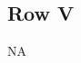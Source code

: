 \documentclass[9pt]{article}
\numberwithin{equation}{section}
\begin{document}
\subsection{Row V}
\textsc{NA}

\end{document}
